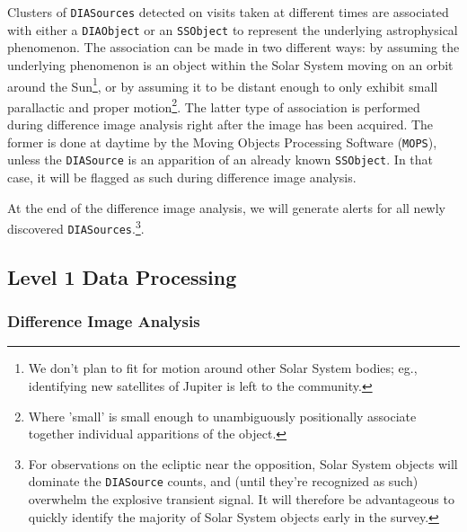 \documentclass[12pt]{article}
\newcommand{\code}[1]{\texttt{#1}}
\newcommand{\DIASource}{\code{DIASource}\xspace}
\newcommand{\DIASources}{\code{DIASources}\xspace}
\newcommand{\DIAObject}{\code{DIAObject}\xspace}
\newcommand{\SSObject}{\code{SSObject}\xspace}
\begin{document}
Clusters of \DIASources detected on visits taken at different times are associated with either a \DIAObject or an \SSObject to represent the underlying astrophysical phenomenon. The association can be made in two different ways: by assuming the underlying phenomenon is an object within the Solar System moving on an orbit around the Sun\footnote{We don't plan to fit for motion around other Solar System bodies; eg., identifying new satellites of Jupiter is left to the community.}, or by assuming it to be distant enough to only exhibit small parallactic and proper motion\footnote{Where 'small' is small enough to unambiguously positionally associate together individual apparitions of the object.}. The latter type of association is performed during difference image analysis right after the image has been acquired. The former is done at daytime by the Moving Objects Processing Software (\code{MOPS}), unless the \DIASource is an apparition of an already known \SSObject. In that case, it will be flagged as such during difference image analysis.

At the end of the difference image analysis, we will generate alerts for all newly discovered \DIASources.\footnote{For observations on the ecliptic near the opposition, Solar System objects will dominate the \DIASource counts, and (until they're recognized as such) overwhelm the explosive transient signal. It will therefore be advantageous to quickly identify the majority of Solar System objects early in the survey.}.

\subsection{Level 1 Data Processing}

\subsubsection{Difference Image Analysis}
\label{sec:dia}
\end{document}

